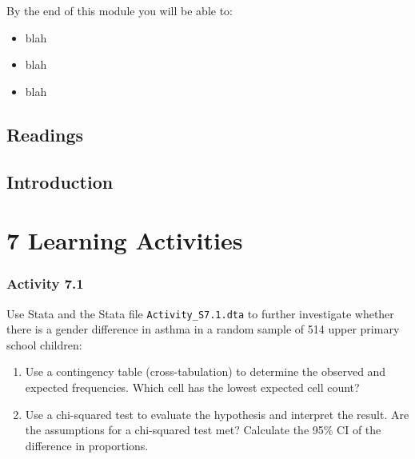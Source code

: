 \documentclass[
]{memoir}
\providecommand{\tightlist}{%
  \setlength{\itemsep}{0pt}\setlength{\parskip}{0pt}}
\begin{document}
By the end of this module you will be able to:

\begin{itemize}
\tightlist
\item
  blah
\item
  blah
\item
  blah
\end{itemize}

\hypertarget{readings-6}{%
\section*{Readings}\label{readings-6}}

\citep{kirkwood_sterne01}

\citep{bland15}

\hypertarget{introduction-4}{%
\section{Introduction}\label{introduction-4}}

\hypertarget{learning-activities-6}{%
\chapter*{\texorpdfstring{\textbf{7} Learning Activities}{7 Learning Activities}}\label{learning-activities-6}}

\hypertarget{activity-7.1}{%
\subsection*{Activity 7.1}\label{activity-7.1}}

Use Stata and the Stata file \texttt{Activity\_S7.1.dta} to further investigate whether there is a gender difference in asthma in a random sample of 514 upper primary school children:

\begin{enumerate}
\def\labelenumi{\alph{enumi})}
\tightlist
\item
  Use a contingency table (cross-tabulation) to determine the observed and expected frequencies. Which cell has the lowest expected cell count?
\item
  Use a chi-squared test to evaluate the hypothesis and interpret the result. Are the assumptions for a chi-squared test met? Calculate the 95\% CI of the difference in proportions.
\end{enumerate}
\end{document}
